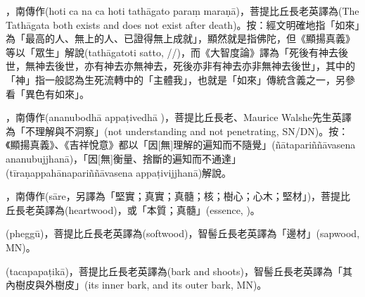 \startitemgroup[noteitems]
\item{}，南傳作(hoti ca na ca hoti tathāgato paraṃ maraṇā)，菩提比丘長老英譯為(The Tathāgata both exists and does not exist after death)。按：經文明確地指「如來」為「最高的人、無上的人、已證得無上成就」，顯然就是指佛陀，但《顯揚真義》等以「眾生」解說(tathāgatoti satto, //)，而《大智度論》譯為「死後有神去後世，無神去後世，亦有神去亦無神去，死後亦非有神去亦非無神去後世」，其中的「神」指一般認為生死流轉中的「主體我」，也就是「如來」傳統含義之一，另參看「異色有如來」。
\stopitemgroup

\startitemgroup[noteitems]
\item{}，南傳作(ananubodhā appaṭivedhā )，菩提比丘長老、Maurice Walshe先生英譯為「不理解與不洞察」(not understanding and not penetrating, SN/DN)。按：《顯揚真義》、《吉祥悅意》都以「因[無]理解的遍知而不隨覺」(ñātapariññāvasena ananubujjhanā)，「因[無]衡量、捨斷的遍知而不通達」(tīraṇappahānapariññāvasena appaṭivijjhanā)解說。
\stopitemgroup

\startitemgroup[noteitems]
\item{}，南傳作(sāre，另譯為「堅實；真實；真髓；核；樹心；心木；堅材」)，菩提比丘長老英譯為(heartwood)，或「本質；真髓」(essence, )。
\item{}(pheggū)，菩提比丘長老英譯為(softwood)，智髻丘長老英譯為「邊材」(sapwood, MN)。
\item{}(tacapapaṭikā)，菩提比丘長老英譯為(bark and shoots)，智髻丘長老英譯為「其內樹皮與外樹皮」(its inner bark, and its outer bark, MN)。
\stopitemgroup

